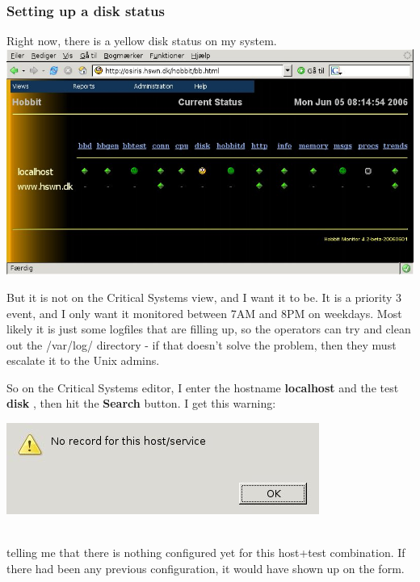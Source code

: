 \begin{itemize}
\end{itemize}
\subsubsection*{Setting up a disk status}


 Right now, there is a yellow disk status on my system.\\ 
\includegraphics[scale=1]{./mainview.png} 


 But it is not on the Critical Systems view, and I want it to be. It is a priority 3 event, and I only want it monitored between 7AM and 8PM on weekdays. Most likely it is just some logfiles that are filling up, so the operators can try and clean out the /var/log/ directory - if that doesn't solve the problem, then they must escalate it to the Unix admins.


 So on the Critical Systems editor, I enter the hostname \textbf{localhost}
 and the test \textbf{disk}
, then hit the \textbf{Search}
 button. I get this warning:\\ 
\begin{center}
\includegraphics[scale=1]{./editor-nohost.png} 
\end{center}
\\ 
 telling me that there is nothing configured yet for this host+test combination. If there had been any previous configuration, it would have shown up on the form.


